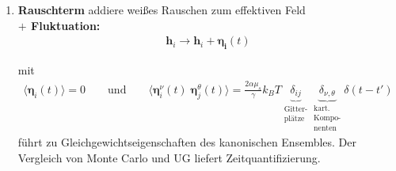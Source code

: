 \documentclass[12pt]{article}
\begin{document}
\begin{enumerate}
  
  \item \textbf{Rauschterm} addiere weißes Rauschen zum effektiven Feld \\
  \textbf{$+$ Fluktuation:}  \\
  
\begin{align*}
\mathbf{h}_i \to \mathbf{h}_i + \mathbf{\eta_i} (t)
\end{align*}  
  
  mit 
\begin{align*}
\langle \mathbf{\eta}_i (t) \rangle = 0 \qquad \text{und} \qquad \langle  \mathbf{\eta}_i^\nu (t)  \;  \mathbf{\eta}_j ^\theta (t) \rangle = \frac{2 \alpha \mu_s }{\gamma} k_B T \underbrace{\delta_{ij}}_{ \substack{ \text{Gitter-} \\ \text{plätze} }} \underbrace{\delta_{\nu, \theta}}_{ \substack{ \text{kart.} \\ \text{Kompo-} \\ \text{nenten}}} \delta (t- t')
\end{align*}  
 führt zu Gleichgewichtseigenschaften des kanonischen Ensembles. Der Vergleich von Monte Carlo und UG liefert Zeitquantifizierung.
   \end{enumerate}
\end{document}
